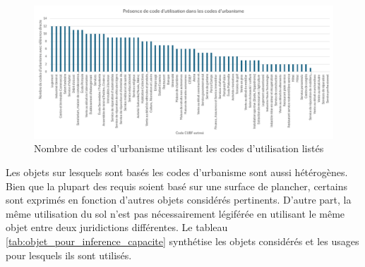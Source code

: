 \begin{landscape}
    \begin{figure}[h]
      \centering
      \includegraphics[width=22cm]{images/presence_requis_par_CUBF}
      \caption{Nombre de codes d'urbanisme utilisant les codes d'utilisation listés}\label{fig:n_utilisation_CUBF_minimums}
    \end{figure}
  \end{landscape}
  \FloatBarrier
  
  Les objets sur lesquels sont basés les codes d'urbanisme sont aussi hétérogènes. Bien que la plupart des requis soient basé sur une surface de plancher, certains sont exprimés en fonction d'autres objets considérés pertinents. D'autre part, la même utilisation du sol n'est pas nécessairement légiférée en utilisant le même objet entre deux juridictions différentes. Le tableau \ref{tab:objet_pour_inference_capacite} synthétise les objets considérés et les usages pour lesquels ils sont utilisés.

